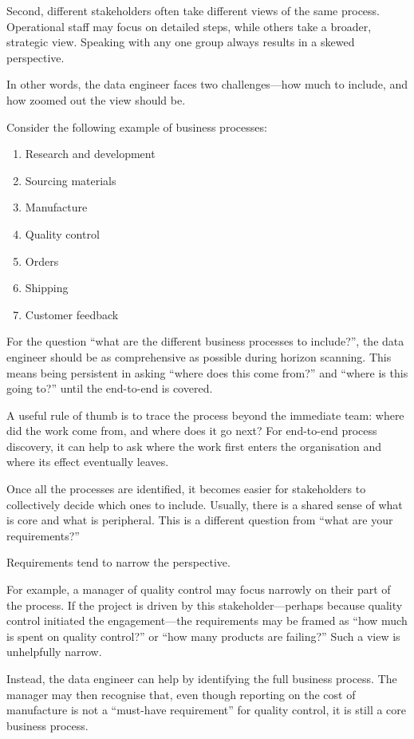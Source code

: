 \documentclass[10pt,openany,10pt]{book}
\providecommand{\tightlist}{%
  \setlength{\itemsep}{0pt}\setlength{\parskip}{0pt}}
\begin{document}
Second, different stakeholders often take different views of the same
process. Operational staff may focus on detailed steps, while others
take a broader, strategic view. Speaking with any one group always
results in a skewed perspective.

In other words, the data engineer faces two challenges---how much to
include, and how zoomed out the view should be.

Consider the following example of business processes:

\begin{enumerate}
\def\labelenumi{\arabic{enumi}.}
\tightlist
\item
  Research and development
\item
  Sourcing materials
\item
  Manufacture
\item
  Quality control
\item
  Orders
\item
  Shipping
\item
  Customer feedback
\end{enumerate}

For the question ``what are the different business processes to
include?'', the data engineer should be as comprehensive as possible
during horizon scanning. This means being persistent in asking ``where
does this come from?'' and ``where is this going to?'' until the
end-to-end is covered.

A useful rule of thumb is to trace the process beyond the immediate
team: where did the work come from, and where does it go next? For
end-to-end process discovery, it can help to ask where the work first
enters the organisation and where its effect eventually leaves.

Once all the processes are identified, it becomes easier for
stakeholders to collectively decide which ones to include. Usually,
there is a shared sense of what is core and what is peripheral. This is
a different question from ``what are your requirements?''

Requirements tend to narrow the perspective.

For example, a manager of quality control may focus narrowly on their
part of the process. If the project is driven by this
stakeholder---perhaps because quality control initiated the
engagement---the requirements may be framed as ``how much is spent on
quality control?'' or ``how many products are failing?'' Such a view is
unhelpfully narrow.

Instead, the data engineer can help by identifying the full business
process. The manager may then recognise that, even though reporting on
the cost of manufacture is not a ``must-have requirement'' for quality
control, it is still a core business process.
\end{document}

